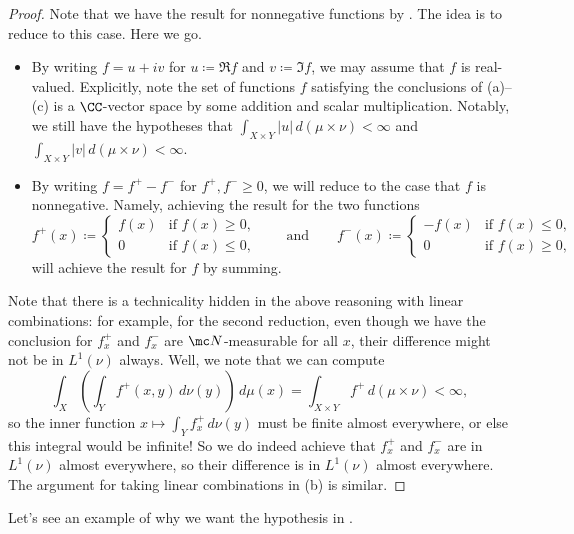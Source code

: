 \documentclass[../notes.tex]{subfiles}
\begin{document}
\begin{proof}
	Note that we have the result for nonnegative functions by . The idea is to reduce to this case. Here we go.
	\begin{itemize}
		\item By writing $f=u+iv$ for $u\coloneqq\Re f$ and $v\coloneqq\Im f$, we may assume that $f$ is real-valued. Explicitly, note the set of functions $f$ satisfying the conclusions of (a)--(c) is a $\CC$-vector space by some addition and scalar multiplication. Notably, we still have the hypotheses that $\int_{X\times Y}\left|u\right|\,d(\mu\times\nu)<\infty$ and $\int_{X\times Y}\left|v\right|\,d(\mu\times\nu)<\infty$.

		\item By writing $f=f^+-f^-$ for $f^+,f^-\ge0$, we will reduce to the case that $f$ is nonnegative. Namely, achieving the result for the two functions
		\[f^+(x)\coloneqq\begin{cases}
			f(x) & \text{if }f(x)\ge0, \\
			0 & \text{if }f(x)\le0,
		\end{cases}\qquad\text{and}\qquad f^-(x)\coloneqq\begin{cases}
			-f(x) & \text{if }f(x)\le0, \\
			0 & \text{if }f(x)\ge0,
		\end{cases}\]
		will achieve the result for $f$ by summing.
	\end{itemize}
	Note that there is a technicality hidden in the above reasoning with linear combinations: for example, for the second reduction, even though we have the conclusion for $f^+_x$ and $f^-_x$ are $\mc N$-measurable for all $x$, their difference might not be in $L^1(\nu)$ always. Well, we note that we can compute
	\[\int_X\left(\int_Yf^+(x,y)\,d\nu(y)\right)\,d\mu(x)=\int_{X\times Y}f^+\,d(\mu\times\nu)<\infty,\]
	so the inner function $x\mapsto\int_Yf^+_x\,d\nu(y)$ must be finite almost everywhere, or else this integral would be infinite! So we do indeed achieve that $f^+_x$ and $f^-_x$ are in $L^1(\nu)$ almost everywhere, so their difference is in $L^1(\nu)$ almost everywhere. The argument for taking linear combinations in (b) is similar.
\end{proof}
Let's see an example of why we want the hypothesis in .
\end{document}
